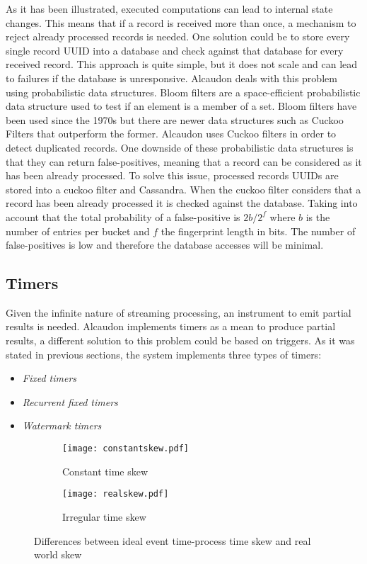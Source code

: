 As it has been illustrated, executed computations can lead to internal state
changes. This means that if a record is received more than once, a mechanism to
reject already processed records is needed. One solution could be to store every
single record \acs{UUID} into a database and check against that database for
every received record. This approach is quite simple, but it does not scale and
can lead to failures if the database is unresponsive. Alcaudon deals with this
problem using probabilistic data structures. Bloom filters are a space-efficient
probabilistic data structure used to test if an element is a member of a set.
Bloom filters have been used since the 1970s but there are newer data structures
such as Cuckoo Filters\cite{cuckoo} that outperform the former. Alcaudon uses
Cuckoo filters in order to detect duplicated records. One downside of these
probabilistic data structures is that they can return false-positives, meaning
that a record can be considered as it has been already processed. To solve this
issue, processed records \acs{UUID}s are stored into a cuckoo filter and
Cassandra. When the cuckoo filter considers that a record has been already
processed it is checked against the database. Taking into account that the total
probability of a false-positive is $2b/2^{f}$ where $b$ is the number of entries
per bucket and $f$ the fingerprint length in bits. The number of false-positives
is low and therefore the database accesses will be minimal.

\subsection{Timers}

Given the infinite nature of streaming processing, an instrument to
emit partial results is needed. Alcaudon implements timers as a mean
to produce partial results, a different solution to this problem could
be based on triggers. As it was stated in previous sections, the system
implements three types of timers:

\begin{itemize}
\item \textit{Fixed timers}
\item \textit{Recurrent fixed timers}
\item \textit{Watermark timers}
\end{itemize}


\begin{figure}
\centering
\begin{subfigure}{.5\textwidth}
  \centering
  \texttt{[image: constantskew.pdf]}
  \caption{Constant time skew}
  \label{fig:constantskew}
\end{subfigure}%
\begin{subfigure}{.5\textwidth}
  \centering
  \texttt{[image: realskew.pdf]}
  \caption{Irregular time skew}
  \label{fig:randomskew}
\end{subfigure}
\caption{Differences between ideal event time-process time skew and real world skew}
\label{fig:skew}
\end{figure}

